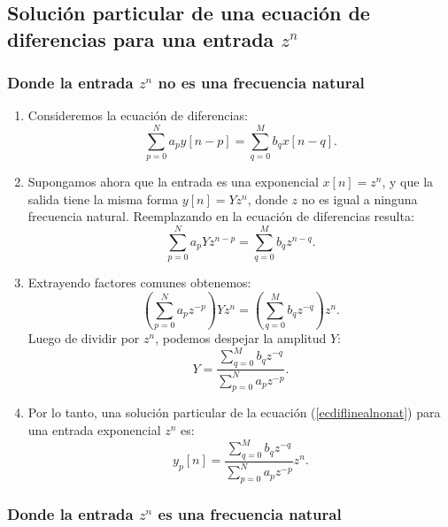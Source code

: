 \subsection{Soluci\'{o}n particular de una ecuaci\'{o}n de diferencias para una entrada $z^{n}$}

\subsubsection{Donde la entrada $z^{n}$ no es una frecuencia natural}

\begin{enumerate}
	\item Consideremos la ecuaci\'{o}n de diferencias:
	\begin{equation}
		\sum_{p=0}^{N}a_{p} y[n-p] = \sum_{q=0}^{M}b_{q} x[n-q]. \label{ecdiflinealnonat}
	\end{equation}
	
	\item Supongamos ahora que la entrada es una exponencial $x[n] = z^{n}$, y que la salida tiene la misma forma $y[n] = Y z^{n}$, donde $z$ no es igual a ninguna frecuencia natural. Reemplazando en la ecuaci\'{o}n de diferencias resulta:
	\begin{equation}
		\sum_{p=0}^{N}a_{p} Y z^{n-p} = \sum_{q=0}^{M}b_{q} z^{n-q}.
	\end{equation}
	
	\item Extrayendo factores comunes obtenemos:
	\begin{equation}
		\left( \sum_{p=0}^{N}a_{p} z^{-p} \right) Y z^{n} = \left(\sum_{q=0}^{M}b_{q} z^{-q} \right) z^{n}. \label{ecdifpart}
	\end{equation}
	Luego de dividir por $z^n$, podemos despejar la amplitud $Y$:
	\begin{equation}
		Y = \frac{\sum_{q=0}^{M}b_{q} z^{-q}}{\sum_{p=0}^{N}a_{p} z^{-p}}.
	\end{equation}
	
	\item Por lo tanto, una soluci\'{o}n particular de la ecuaci\'{o}n (\ref{ecdiflinealnonat}) para una entrada exponencial $z^{n}$ es:
	\begin{equation}
		y_{p}[n] = \frac{\sum_{q=0}^{M}b_{q} z^{-q}}{\sum_{p=0}^{N}a_{p} z^{-p}} z^{n}. \label{eqhzorig}
	\end{equation}
\end{enumerate}

\subsubsection{Donde la entrada $z^{n}$ es una frecuencia natural}

